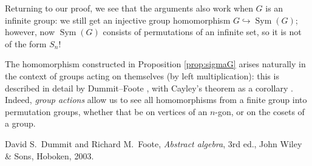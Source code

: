 \documentclass[12pt]{amsart}
\numberwithin{equation}{section}
\theoremstyle{definition}
\theoremstyle{remark}
\numberwithin{equation}{section}
\DeclareMathOperator{\Sym}{Sym}
\begin{document}
Returning to our proof, we see that the arguments also work when $G$ is an infinite group: we still get an injective group homomorphism $G \hookrightarrow \Sym(G)$; however, now $\Sym(G)$ consists of permutations of an infinite set, so it is not of the form $S_n$!  

The homomorphism constructed in Proposition \ref{prop:sigmaG} arises naturally in the context of groups acting on themselves (by left multiplication): this is described in detail by Dummit--Foote \cite[\S 4.2]{DummitFoote}, with Cayley's theorem as a corollary \cite[\S 4.2, Corollary 4, p.~120]{DummitFoote}.  Indeed, \emph{group actions} allow us to see all homomorphisms from a finite group into permutation groups, whether that be on vertices of an $n$-gon, or on the cosets of a group.  

\begin{thebibliography}{99}


David S.~Dummit and Richard M.~Foote, \emph{Abstract algebra}, 3rd ed., John Wiley \& Sons, Hoboken, 2003.


\end{thebibliography}
\end{document}
